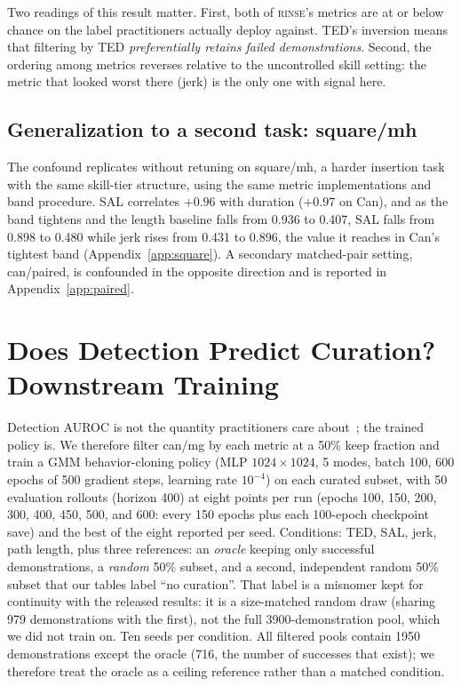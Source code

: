 \documentclass[10pt]{article}
\newcommand{\rinse}{\textsc{rinse}}
\begin{document}
Two readings of this result matter. First, both of \rinse{}'s metrics are at
or below chance on the label practitioners actually deploy against. TED's
inversion means that filtering by TED \emph{preferentially retains failed
demonstrations}. Second, the ordering among metrics reverses relative to the
uncontrolled skill setting: the metric that looked worst there (jerk) is the
only one with signal here.

\subsection{Generalization to a second task: square/mh}
\label{sec:square}

The confound replicates without retuning on square/mh, a harder insertion
task with the same skill-tier structure, using the same metric
implementations and band procedure. SAL correlates $+0.96$ with duration
($+0.97$ on Can), and as the band tightens and the length baseline falls
from 0.936 to 0.407, SAL falls from 0.898 to 0.480 while jerk rises from
0.431 to 0.896, the value it reaches in Can's tightest band
(Appendix~\ref{app:square}). A secondary matched-pair setting, can/paired,
is confounded in the opposite direction and is reported in
Appendix~\ref{app:paired}.

\section{Does Detection Predict Curation? Downstream Training}
\label{sec:training}

Detection AUROC is not the quantity practitioners care
about~\citep{bedi-policy}; the trained policy is. We therefore filter can/mg
by each metric at a 50\% keep fraction and train a GMM behavior-cloning
policy (MLP $1024{\times}1024$, 5 modes, batch 100, 600 epochs of 500
gradient steps, learning rate $10^{-4}$) on each curated subset, with 50
evaluation rollouts (horizon 400) at eight points per run (epochs 100, 150,
200, 300, 400, 450, 500, and 600: every 150 epochs plus each 100-epoch
checkpoint save) and the best of the eight reported per seed. Conditions: TED, SAL, jerk, path length, plus three
references: an \emph{oracle} keeping only successful demonstrations, a
\emph{random} 50\% subset, and a second, independent random 50\% subset that
our tables label ``no curation''. That label is a misnomer kept for
continuity with the released results: it is a size-matched random draw
(sharing 979 demonstrations with the first), not the full
3900-demonstration pool, which we did not train on. Ten seeds
per condition. All filtered pools contain 1950 demonstrations except the
oracle (716, the number of successes that exist); we therefore treat the
oracle as a ceiling reference rather than a matched condition.
\end{document}
